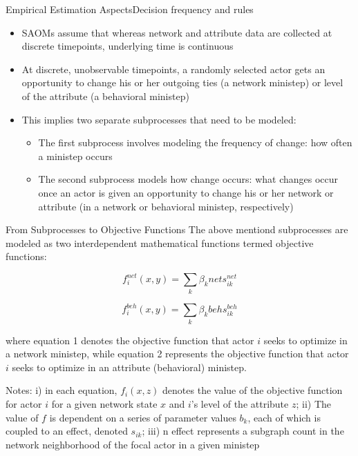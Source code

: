 \documentclass[notes, aspectratio=1610]{beamer}
\begin{document}
\begin{frame}{Empirical Estimation Aspects}{Decision frequency and rules}
	\begin{itemize}
		\item SAOMs assume that whereas network and attribute data 
		are collected at discrete timepoints, underlying time is 
		continuous
		\item At discrete, unobservable timepoints, a randomly 
		selected actor gets an opportunity to change his or her outgoing 
		ties (a network ministep) or level of the attribute (a 
		behavioral ministep)
		\item This implies two separate subprocesses that need to be 
		modeled:
		\begin{itemize}
			\item The first subprocess involves modeling the 
			frequency of change: how often a ministep occurs
			\item The second subprocess models how change occurs: 
			what changes occur once an actor is given an opportunity 
			to change his or her network or attribute (in a network 
			or behavioral ministep, respectively)
		\end{itemize}
	\end{itemize}
\end{frame}

\begin{frame}{From Subprocesses to Objective Functions}
	The above mentiond subprocesses are modeled as two interdependent 
	mathematical functions termed objective functions:
	
	
	\begin{equation}
		f_{i}^{net}(x, y) = \sum_{k}\beta_{k}{net}s_{ik}^{net}
	\end{equation}

	\begin{equation}
		f_{i}^{beh}(x, y) = \sum_{k}\beta_{k}{beh}s_{ik}^{beh}
	\end{equation}

	where equation 1 denotes the objective function that actor $i$ seeks 
	to optimize in a network ministep, while equation 2 represents the 
	objective function that actor $i$ seeks to optimize in an attribute 
	(behavioral) ministep.

	\small Notes: i) in each equation, $f_{i}(x,z)$ denotes the value of the objective 
	function for actor $i$ for a given network state $x$ and $i$'s level of the 
	attribute $z$; ii) The value of $f$ is dependent on a series of parameter 
	values $b_{k}$, each of which is coupled to an effect, denoted $s_{ik}$; 
	iii) n effect represents a subgraph count in the network neighborhood of 
	the focal actor in a given ministep 
\end{frame}
\end{document}
